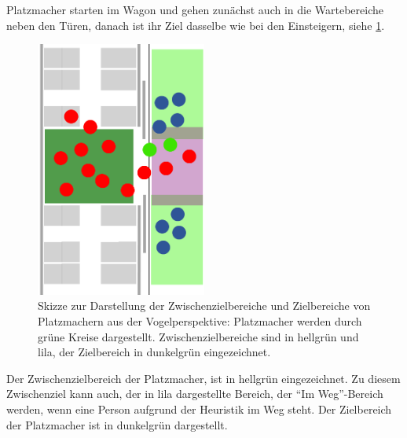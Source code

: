 Platzmacher starten im Wagon und gehen zunächst auch in die Wartebereiche neben den Türen, danach ist ihr Ziel dasselbe wie bei den Einsteigern, siehe \figurename \ref{fig:SkizzePlatzmacher}.
\begin{figure}[H]
	\centering
		\includegraphics[angle=270, width=0.5\textwidth]{pictures/model/kognitive_heuristic_model/spacemaker_sketch.png}
	\caption{Skizze zur Darstellung der Zwischenzielbereiche und Zielbereiche von Platzmachern aus der Vogelperspektive: Platzmacher werden durch grüne Kreise dargestellt. Zwischenzielbereiche sind in hellgrün und lila, der Zielbereich in dunkelgrün eingezeichnet.}
	\label{fig:SkizzePlatzmacher}
\end{figure}
Der Zwischenzielbereich der Platzmacher, ist in hellgrün eingezeichnet. Zu diesem Zwischenziel kann auch, der in lila dargestellte Bereich, der "`Im Weg"'-Bereich werden, wenn eine Person aufgrund der Heuristik im Weg steht. Der Zielbereich der Platzmacher ist in dunkelgrün dargestellt.
